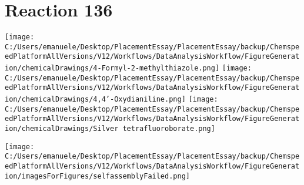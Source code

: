 \documentclass{article}%
\begin{document}
\section*{Reaction 136}%
%
\begin{scheme}[H]%
\begin{minipage}{0.5\textwidth}%
\texttt{[image: C:/Users/emanuele/Desktop/PlacementEssay/PlacementEssay/backup/ChemspeedPlatformAllVersions/V12/Workflows/DataAnalysisWorkflow/FigureGeneration/chemicalDrawings/4-Formyl-2-methylthiazole.png]}%
\texttt{[image: C:/Users/emanuele/Desktop/PlacementEssay/PlacementEssay/backup/ChemspeedPlatformAllVersions/V12/Workflows/DataAnalysisWorkflow/FigureGeneration/chemicalDrawings/4,4'-Oxydianiline.png]}%
\texttt{[image: C:/Users/emanuele/Desktop/PlacementEssay/PlacementEssay/backup/ChemspeedPlatformAllVersions/V12/Workflows/DataAnalysisWorkflow/FigureGeneration/chemicalDrawings/Silver tetrafluoroborate.png]}%
\end{minipage}%
\begin{minipage}{0.5\textwidth}%
\begin{center}%
\texttt{[image: C:/Users/emanuele/Desktop/PlacementEssay/PlacementEssay/backup/ChemspeedPlatformAllVersions/V12/Workflows/DataAnalysisWorkflow/FigureGeneration/imagesForFigures/selfassemblyFailed.png]}%
\end{center}%
\end{minipage}%
\caption{Self-assembly of components 1, 15, with Silver(I) in a 3.0:1.5:1.0 molar ratio in CH$_3$CN at 60\textdegree C for 40h. These are the reagents (starting materials) for reaction 136.}%
\end{scheme}%
\end{document}
